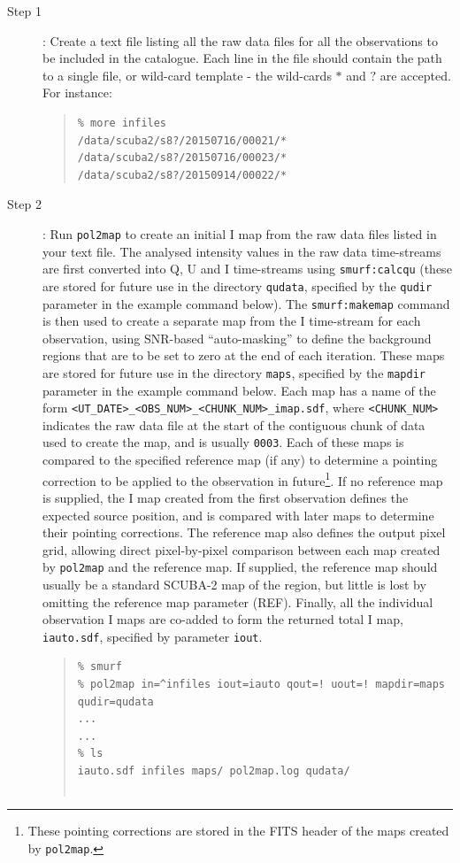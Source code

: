 \documentclass[twoside,11pt]{starlink}
\begin{document}
\begin{description}
\item[Step 1]:  Create a text file listing all the raw data files for all
the observations to be included in the catalogue. Each line in the file
should contain the path to a single file, or wild-card template - the
wild-cards $*$ and $?$ are accepted. For instance:
\begin{quote}
\begin{verbatim}
% more infiles
/data/scuba2/s8?/20150716/00021/*
/data/scuba2/s8?/20150716/00023/*
/data/scuba2/s8?/20150914/00022/*
\end{verbatim}
\end{quote}

\item[Step 2]:  Run \texttt{pol2map} to create an initial I map from
the raw data files listed in your text file. The analysed intensity
values in the raw data time-streams are first converted into Q, U and I
time-streams using \texttt{smurf:calcqu} (these are stored for future use
in the directory \texttt{qudata}, specified by the \texttt{qudir}
parameter in the example command below). The \texttt{smurf:makemap} command is then used to create a
separate map from the I time-stream for each observation, using SNR-based
``auto-masking'' to define the background regions that are to be set to
zero at the end of each iteration. These maps are stored for future use
in the directory \texttt{maps}, specified by the
\texttt{mapdir} parameter in the example command below. Each map has a name of the form
\texttt{<UT\_DATE>\_<OBS\_NUM>\_<CHUNK\_NUM>\_imap.sdf}, where
\texttt{<CHUNK\_NUM>} indicates the raw data file at the start of the
contiguous chunk of data used to create the map, and is usually \texttt{0003}.
Each of these maps is compared to the specified reference map (if any)
to determine a pointing correction to be applied to the observation in
future\footnote{These pointing corrections are stored in the FITS header of
the maps created by \texttt{pol2map}.}. If no reference map is supplied, the I map created from the
first observation defines the expected source position, and is compared
with later maps to determine their pointing corrections. The reference map also
defines the output pixel grid, allowing direct pixel-by-pixel comparison between
each map created by \texttt{pol2map} and the reference map. If supplied,
the reference map should usually be a standard SCUBA-2 map of the region,
but little is lost by omitting the reference map parameter (REF).
Finally, all the individual observation I maps are co-added to form the returned
total I map, \texttt{iauto.sdf}, specified by parameter \texttt{iout}.
\begin{quote}
\begin{verbatim}
% smurf
% pol2map in=^infiles iout=iauto qout=! uout=! mapdir=maps qudir=qudata
...
...
% ls
iauto.sdf infiles maps/ pol2map.log qudata/


\end{verbatim}
\end{quote}
\end{description}
\end{document}
